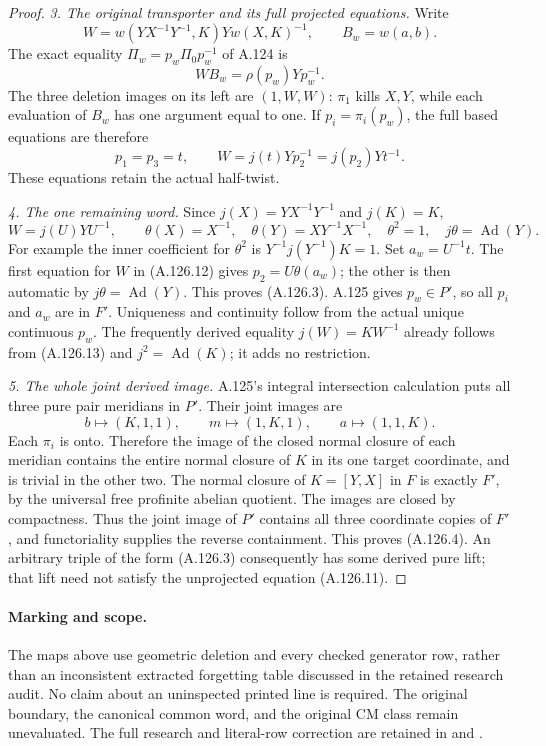 \begin{proof}
\emph{3. The original transporter and its full projected equations.}
Write
\[
 W=w(YX^{-1}Y^{-1},K)Yw(X,K)^{-1},\qquad B_w=w(a,b).
\]
The exact equality \(\Pi_w=p_w\Pi_0p_w^{-1}\) of A.124 is
\[
                   WB_w=\rho(p_w)Yp_w^{-1}.                 \tag{A.126.11}
\]
The three deletion images on its left are \((1,W,W)\):
\(\pi_1\) kills \(X,Y\), while each evaluation of \(B_w\)
has one argument equal to one. If \(p_i=\pi_i(p_w)\),
the full based equations are therefore
\[
       p_1=p_3=t,\qquad
       W=j(t)Yp_2^{-1}=j(p_2)Yt^{-1}.                       \tag{A.126.12}
\]
These equations retain the actual half-twist.

\emph{4. The one remaining word.}
Since \(j(X)=YX^{-1}Y^{-1}\) and \(j(K)=K\),
\[
 W=j(U)YU^{-1},\qquad
 \theta(X)=X^{-1},\quad\theta(Y)=XY^{-1}X^{-1},\quad
 \theta^2=1,\quad j\theta=\operatorname{Ad}(Y).               \tag{A.126.13}
\]
For example the inner coefficient for \(\theta^2\) is
\(Y^{-1}j(Y^{-1})K=1\). Set \(a_w=U^{-1}t\). The first
equation for \(W\) in (A.126.12) gives
\(p_2=U\theta(a_w)\); the other is then automatic by
\(j\theta=\operatorname{Ad}(Y)\). This proves (A.126.3).
A.125 gives \(p_w\in P'\), so all \(p_i\) and \(a_w\) are
in \(F'\). Uniqueness and continuity follow from the actual
unique continuous \(p_w\). The frequently derived equality
\(j(W)=KW^{-1}\) already follows from (A.126.13) and
\(j^2=\operatorname{Ad}(K)\); it adds no restriction.

\emph{5. The whole joint derived image.}
A.125's integral intersection calculation puts all three pure
pair meridians in \(P'\). Their joint images are
\[
       b\mapsto(K,1,1),\qquad m\mapsto(1,K,1),
       \qquad a\mapsto(1,1,K).
\]
Each \(\pi_i\) is onto. Therefore the image of the closed normal
closure of each meridian contains the entire normal closure of
\(K\) in its one target coordinate, and is trivial in the other
two. The normal closure of \(K=[Y,X]\) in \(F\) is exactly
\(F'\), by the universal free profinite abelian quotient.
The images are closed by compactness. Thus the joint image of
\(P'\) contains all three coordinate copies of \(F'\), and
functoriality supplies the reverse containment. This proves
(A.126.4). An arbitrary triple of the form (A.126.3) consequently
has some derived pure lift; that lift need not satisfy the
unprojected equation (A.126.11).
\end{proof}

\paragraph{Marking and scope.}
The maps above use geometric deletion and every checked generator
row, rather than an inconsistent extracted forgetting table
discussed in the retained research audit. No claim about an
uninspected printed line is required. The original boundary,
the canonical common word, and the original CM class remain
unevaluated. The full research and literal-row correction are
retained in
 and
.
